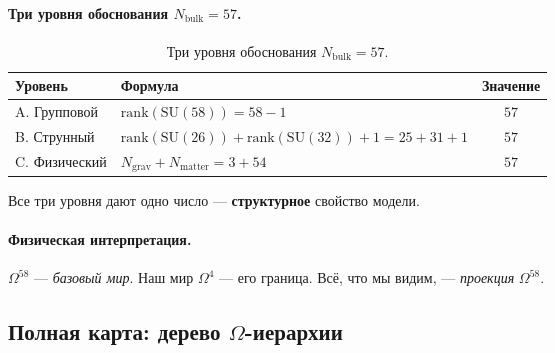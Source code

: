 \documentclass[11pt,a4paper]{article}
\newcommand{\SU}{\mathrm{SU}}
\newcommand{\rank}{\mathrm{rank}}
\newcommand{\Om}{\Omega^4}
\newcommand{\Omfi}{\Omega^{58}}
\newcommand{\Nbulk}{N_{\text{bulk}}}
\theoremstyle{definition}
\begin{document}
\paragraph{Три уровня обоснования \texorpdfstring{$\Nbulk = 57$}{N\_bulk = 57}.}

\begin{table}[htbp]
\centering
\caption{Три уровня обоснования $\Nbulk = 57$.}
\label{tab:three-levels-nbulk}
\begin{tabular}{llc}
\toprule
Уровень & Формула & Значение \\
\midrule
A. Групповой & $\rank(\SU(58)) = 58 - 1$ & $57$ \\[0.3em]
B. Струнный & $\rank(\SU(26)) + \rank(\SU(32)) + 1 = 25 + 31 + 1$ & $57$ \\[0.3em]
C. Физический & $N_{\text{grav}} + N_{\text{matter}} = 3 + 54$ & $57$ \\
\bottomrule
\end{tabular}
\end{table}

\noindent
Все три уровня дают одно число — \textbf{структурное} свойство модели.

\paragraph{Физическая интерпретация.}
$\Omfi$ — \emph{базовый мир}. Наш мир $\Om$ — его граница. 
Всё, что мы видим, — \emph{проекция} $\Omfi$.

\subsection{Полная карта: дерево $\Omega$-иерархии}
\label{subsec:full-map}
\end{document}
